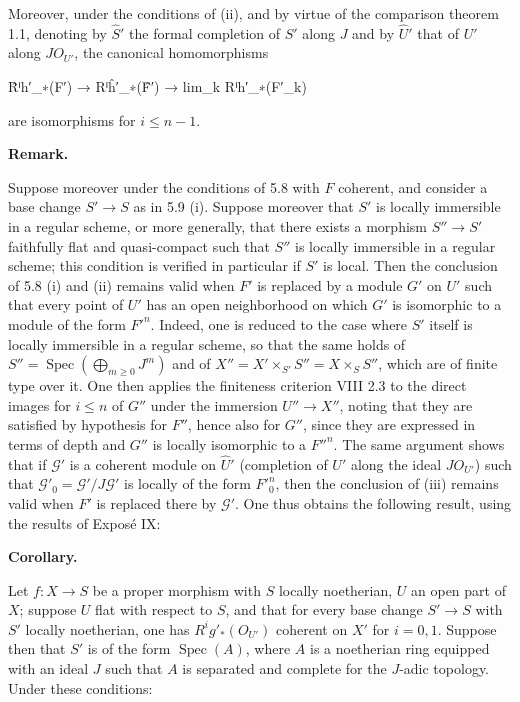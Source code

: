\documentclass[
  11pt,
  a4paper,
]{book}
\newenvironment{Shaded}{}{}
\newcommand{\NormalTok}[1]{#1}
\begin{document}
Moreover, under the conditions of (ii), and by virtue of the comparison
theorem 1.1, denoting by \(\hat{S}'\) the formal completion of \(S'\)
along \(J\) and by \(\hat{U}'\) that of \(U'\) along \(J O_{U'}\), the
canonical homomorphisms

\begin{Shaded}
\begin{Highlighting}[]
\NormalTok{R̂ⁱh′\_∗(F′) → Rⁱĥ′\_∗(F̂′) → lim\_k Rⁱh′\_∗(F′\_k)}
\end{Highlighting}
\end{Shaded}

are isomorphisms for \(i \leqslant n - 1\).

\textbf{Remark.}

Suppose moreover under the conditions of 5.8 with \(F\) coherent, and
consider a base change \(S' \to S\) as in 5.9 (i). Suppose moreover that
\(S'\) is locally immersible in a regular scheme, or more generally,
that there exists a morphism \(S'' \to S'\) faithfully flat and
quasi-compact such that \(S''\) is locally immersible in a regular
scheme; this condition is verified in particular if \(S'\) is local.
Then the conclusion of 5.8 (i) and (ii) remains valid when \(F'\) is
replaced by a module \(G'\) on \(U'\) such that every point of \(U'\)
has an open neighborhood on which \(G'\) is isomorphic to a module of
the form \(F'^{n}\). Indeed, one is reduced to the case where \(S'\)
itself is locally immersible in a regular scheme, so that the same holds
of \(S'' = \operatorname{Spec}(\bigoplus_{m\geqslant 0} J^{m})\) and of
\(X'' = X' \times_{S'} S'' = X
\times_{S} S''\), which are of finite type over it. One then applies the
finiteness criterion VIII 2.3 to the direct images for \(i \leqslant n\)
of \(G''\) under the immersion \(U'' \to X''\), noting that they are
satisfied by hypothesis for \(F''\), hence also for \(G''\), since they
are expressed in terms of depth and \(G''\) is locally isomorphic to a
\(F''^{n}\). The same argument shows that if \(\mathcal{G}'\) is a
coherent module on \(\hat{U}'\) (completion of \(U'\) along the ideal
\(J
O_{U'}\)) such that \(\mathcal{G}'_{0} = \mathcal{G}'/J \mathcal{G}'\)
is locally of the form \(F'^{n}_{0}\), then the conclusion of (iii)
remains valid when \(F'\) is replaced there by \(\mathcal{G}'\). One
thus obtains the following result, using the results of Exposé IX:

\textbf{Corollary.}

Let \(f: X \to S\) be a proper morphism with \(S\) locally noetherian,
\(U\) an open part of \(X\); suppose \(U\) flat with respect to \(S\),
and that for every base change \(S' \to S\) with \(S'\) locally
noetherian, one has \(R^{i}g'_{\ast}(O_{U'})\) coherent on \(X'\) for
\(i = 0, 1\). Suppose then that \(S'\) is of the form
\(\operatorname{Spec}(A)\), where \(A\) is a noetherian ring equipped
with an ideal \(J\) such that \(A\) is separated and complete for the
\(J\)-adic topology. Under these conditions:
\end{document}
